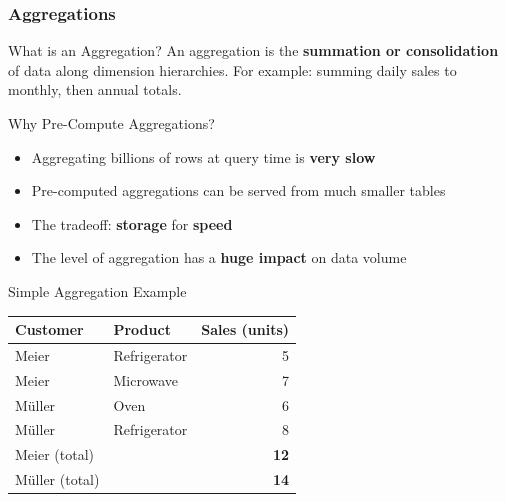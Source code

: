 \begin{frame}
  \frametitle{Aggregations}

  \begin{block}{What is an Aggregation?}
    An aggregation is the \textbf{summation or consolidation} of data along
    dimension hierarchies.
    For example: summing daily sales to monthly, then annual totals.
  \end{block}

  \begin{block}{Why Pre-Compute Aggregations?}
    \begin{itemize}
      \item Aggregating billions of rows at query time is \textbf{very slow}
      \item Pre-computed aggregations can be served from much smaller tables
      \item The tradeoff: \textbf{storage} for \textbf{speed}
      \item The level of aggregation has a \textbf{huge impact} on data volume
    \end{itemize}
  \end{block}

  \begin{examples}{Simple Aggregation Example}
    \begin{tabularx}{\linewidth}{@{}l l r@{}}
      \toprule
      \textbf{Customer} & \textbf{Product}  & \textbf{Sales (units)} \\
      \midrule
      Meier             & Refrigerator       & 5 \\
      Meier             & Microwave          & 7 \\
      Müller            & Oven               & 6 \\
      Müller            & Refrigerator       & 8 \\
      \midrule
      Meier (total)     &                    & \textbf{12} \\
      Müller (total)    &                    & \textbf{14} \\
      \bottomrule
    \end{tabularx}
  \end{examples}
\end{frame}
